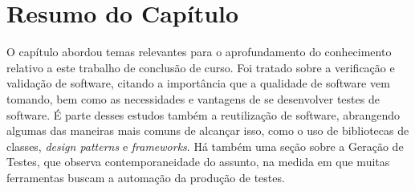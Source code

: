 \section{Resumo do Capítulo}
O capítulo abordou temas relevantes para o aprofundamento do conhecimento
relativo a este trabalho de conclusão de curso. Foi tratado sobre a verificação
e validação de software, citando a importância que a qualidade de software vem
tomando, bem como as necessidades e vantagens de se desenvolver testes de
software. É parte desses estudos também a reutilização de software, abrangendo
algumas das maneiras mais comuns de alcançar isso, como o uso de bibliotecas de
classes, \textit{design patterns} e \textit{frameworks}. Há também uma seção sobre
a Geração de Testes, que observa contemporaneidade do assunto, na medida em que
muitas ferramentas buscam a automação da produção de testes.
